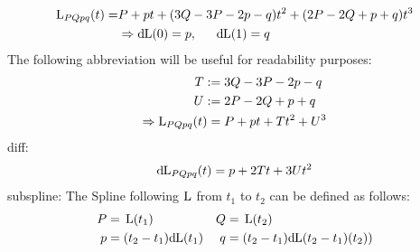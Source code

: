     $$\begin{aligned}
        \operatorname{L}_{PQpq}(t) =& P + pt + (3Q-3P-2p-q)t^2 + (2P-2Q+p+q)t^3 \\
        &\Rightarrow {\rm d}\hspace{-2pt}\operatorname{L}(0) = p,\phantom{--} {\rm d}\hspace{-2pt}\operatorname{L}(1) = q \\
    \end{aligned}$$
    The following abbreviation will be useful for readability purposes:
    $$\begin{aligned}
        T :=&\phantom{.} 3Q-3P-2p-q \\
        U :=&\phantom{.} 2P-2Q+p+q \\
        \Rightarrow \operatorname{L}_{PQpq}(t) =&\phantom{.} P + pt + Tt^2 + U^3 \\
    \end{aligned}$$
    diff:
    $$\begin{aligned}
        {\rm d}\hspace{-2pt}\operatorname{L}_{PQpq}(t) = p + 2Tt + 3Ut^2 \\
    \end{aligned}$$
    subspline:
    The Spline following $\operatorname{L}$ from $t_1$ to $t_2$ can be defined as follows:
    $$\begin{aligned}
        P =&\phantom{.} \operatorname{L}(t_1) & Q =&\phantom{.} \operatorname{L}(t_2) \\
        p =&\phantom{.} (t_2-t_1){\rm d}\hspace{-2pt}\operatorname{L}(t_1) & q =&\phantom{.} (t_2-t_1){\rm d}\hspace{-2pt}\operatorname{L}(t_2-t_1)(t_2)) \\
    \end{aligned}$$
